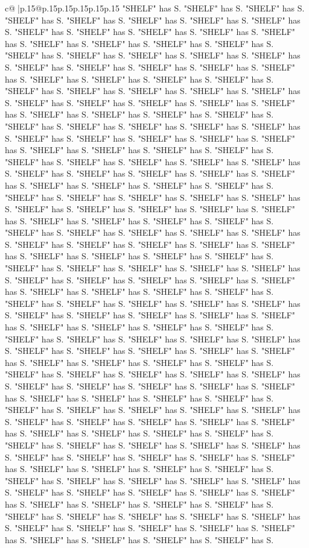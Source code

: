 \documentclass{article}
\begin{document}
{\begin{supertabular}{c@{$\;$}|p{.15\linewidth}@{}p{.15\linewidth}p{.15\linewidth}p{.15\linewidth}p{.15\linewidth}p{.15\linewidth}}
{{{"SHELF" has S. "SHELF" has S. "SHELF" has S. "SHELF" has S. "SHELF" has S. "SHELF" has S. "SHELF" has S. "SHELF" has S. "SHELF" has S. "SHELF" has S. "SHELF" has S. "SHELF" has S. "SHELF" has S. "SHELF" has S. "SHELF" has S. "SHELF" has S. "SHELF" has S. "SHELF" has S. "SHELF" has S. "SHELF" has S. "SHELF" has S. "SHELF" has S. "SHELF" has S. "SHELF" has S. "SHELF" has S. "SHELF" has S. "SHELF" has S. "SHELF" has S. "SHELF" has S. "SHELF" has S. "SHELF" has S. "SHELF" has S. "SHELF" has S. "SHELF" has S. "SHELF" has S. "SHELF" has S. "SHELF" has S. "SHELF" has S. "SHELF" has S. "SHELF" has S. "SHELF" has S. "SHELF" has S. "SHELF" has S. "SHELF" has S. "SHELF" has S. "SHELF" has S. "SHELF" has S. "SHELF" has S. "SHELF" has S. "SHELF" has S. "SHELF" has S. "SHELF" has S. "SHELF" has S. "SHELF" has S. "SHELF" has S. "SHELF" has S. "SHELF" has S. "SHELF" has S. "SHELF" has S. "SHELF" has S. "SHELF" has S. "SHELF" has S. "SHELF" has S. "SHELF" has S. "SHELF" has S. "SHELF" has S. "SHELF" has S. "SHELF" has S. "SHELF" has S. "SHELF" has S. "SHELF" has S. "SHELF" has S. "SHELF" has S. "SHELF" has S. "SHELF" has S. "SHELF" has S. "SHELF" has S. "SHELF" has S. "SHELF" has S. "SHELF" has S. "SHELF" has S. "SHELF" has S. "SHELF" has S. "SHELF" has S. "SHELF" has S. "SHELF" has S. "SHELF" has S. "SHELF" has S. "SHELF" has S. "SHELF" has S. "SHELF" has S. "SHELF" has S. "SHELF" has S. "SHELF" has S. "SHELF" has S. "SHELF" has S. "SHELF" has S. "SHELF" has S. "SHELF" has S. "SHELF" has S. "SHELF" has S. "SHELF" has S. "SHELF" has S. "SHELF" has S. "SHELF" has S. "SHELF" has S. "SHELF" has S. "SHELF" has S. "SHELF" has S. "SHELF" has S. "SHELF" has S. "SHELF" has S. "SHELF" has S. "SHELF" has S. "SHELF" has S. "SHELF" has S. "SHELF" has S. "SHELF" has S. "SHELF" has S. "SHELF" has S. "SHELF" has S. "SHELF" has S. "SHELF" has S. "SHELF" has S. "SHELF" has S. "SHELF" has S. "SHELF" has S. "SHELF" has S. "SHELF" has S. "SHELF" has S. "SHELF" has S. "SHELF" has S. "SHELF" has S. "SHELF" has S. "SHELF" has S. "SHELF" has S. "SHELF" has S. "SHELF" has S. "SHELF" has S. "SHELF" has S. "SHELF" has S. "SHELF" has S. "SHELF" has S. "SHELF" has S. "SHELF" has S. "SHELF" has S. "SHELF" has S. "SHELF" has S. "SHELF" has S. "SHELF" has S. "SHELF" has S. "SHELF" has S. "SHELF" has S. "SHELF" has S. "SHELF" has S. "SHELF" has S. "SHELF" has S. "SHELF" has S. "SHELF" has S. "SHELF" has S. "SHELF" has S. "SHELF" has S. "SHELF" has S. "SHELF" has S. "SHELF" has S. "SHELF" has S. "SHELF" has S. "SHELF" has S. "SHELF" has S. "SHELF" has S. "SHELF" has S. "SHELF" has S. "SHELF" has S. "SHELF" has S. "SHELF" has S. "SHELF" has S. "SHELF" has S. "SHELF" has S. "SHELF" has S. "SHELF" has S. "SHELF" has S. "SHELF" has S. "SHELF" has S. "SHELF" has S. "SHELF" has S. "SHELF" has S. "SHELF" has S. "SHELF" has S. "SHELF" has S. "SHELF" has S. "SHELF" has S. "SHELF" has S. "SHELF" has S. "SHELF" has S. "SHELF" has S. "SHELF" has S. "SHELF" has S. "SHELF" has S. "SHELF" has S. "SHELF" has S. "SHELF" has S. "SHELF" has S. "SHELF" has S. "SHELF" has S. "SHELF" has S. "SHELF" has S. "SHELF" has S. "SHELF" has S. "SHELF" has S. "SHELF" has S. "SHELF" has S. "SHELF" has S. "SHELF" has S. }}}
\end{supertabular}}
\end{document}
